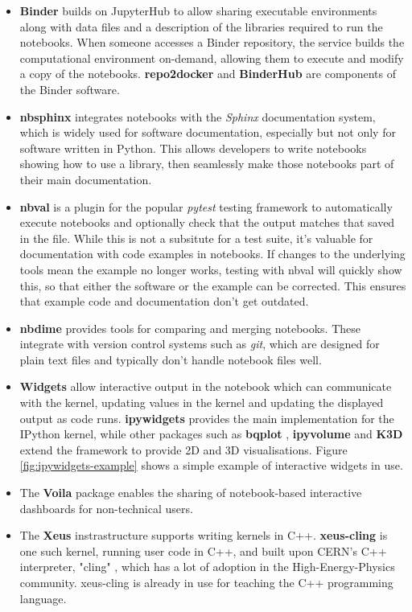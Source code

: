 \begin{itemize}
  \item \textbf{Binder} builds on JupyterHub to allow sharing executable
  environments along with data files and a description of the libraries
  required to run the notebooks. When someone accesses a Binder repository,
  the service builds the computational environment on-demand, allowing them to
  execute and modify a copy of the notebooks.
  \textbf{repo2docker} \cite{repo2docker} and \textbf{BinderHub} \cite{binder} are components of the Binder
  software.

  \item \textbf{nbsphinx} \cite{Nbsphinx} integrates notebooks with the \emph{Sphinx}
  documentation system, which is widely used for software documentation,
  especially but not only for software written in Python.
  This allows developers to write notebooks showing how to use a library,
  then seamlessly make those notebooks part of their main documentation.

  \item \textbf{nbval} \cite{nbval} is a plugin for the popular \emph{pytest} testing
  framework to automatically execute notebooks and optionally check that the
  output matches that saved in the file. While this is not a subsitute for a
  test suite, it's valuable for documentation with code examples in notebooks.
  If changes to the underlying tools mean the example no longer
  works, testing with nbval will quickly show this, so that either the software
  or the example can be corrected. This ensures that example code and
  documentation don't get outdated.

  \item \textbf{nbdime} \cite{nbdime} provides tools for comparing and merging notebooks.
  These integrate with version control systems such as \emph{git}, which
  are designed for plain text files and typically don't handle notebook files
  well.

  \item \textbf{Widgets} allow interactive output in the notebook which can
  communicate with the kernel, updating values in the kernel and updating the
  displayed output as code runs. \textbf{ipywidgets} \cite{ipywidgets} provides the main
  implementation for the IPython kernel, while other packages such as
  \textbf{bqplot} \cite{bqplot}, \textbf{ipyvolume} \cite{ipyvolume} and
  \textbf{K3D} \cite{K3D} extend the framework to provide 2D and 3D visualisations.
  Figure \ref{fig:ipywidgets-example} shows a simple example of interactive
  widgets in use.

  \item The \textbf{Voila} package \cite{Voila} enables the
  sharing of notebook-based interactive dashboards for non-technical users.

  \item The \textbf{Xeus} instrastructure \cite{Corlay2017} supports writing kernels
  in C++. \textbf{xeus-cling} is one such kernel, running user code in C++,
  and built upon CERN's C++ interpreter, "cling" \cite{Vassilev2012},
  which has a lot of adoption in the High-Energy-Physics community.
  xeus-cling is already in use for teaching the C++ programming language.
\end{itemize}

